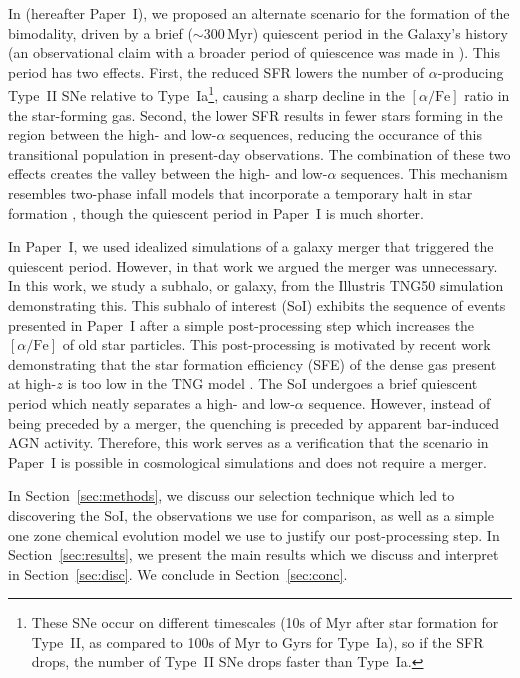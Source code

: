 \documentclass[twocolumn]{aastex631}
\newcommand{\Myr}{\ensuremath{\textrm{Myr}}}
\newcommand{\alphaFe}{\ensuremath{[\alpha/\textrm{Fe}]}}
\begin{document}
In \citet{2024arXiv240707985B} (hereafter Paper~I), we proposed an alternate scenario for the formation of the bimodality, driven by a brief ($\sim300\,\Myr$) quiescent period in the Galaxy's history (an observational claim with a broader period of quiescence was made in \citet{2016A&A...589A..66H}). This period has two effects. First, the reduced SFR lowers the number of $\alpha$-producing Type~II SNe relative to Type~Ia\footnote{These SNe occur on different timescales (10s of Myr after star formation for Type~II, as compared to 100s of Myr to Gyrs for Type~Ia), so if the SFR drops, the number of Type~II SNe drops faster than Type~Ia.}, causing a sharp decline in the \alphaFe{} ratio in the star-forming gas. Second, the lower SFR results in fewer stars forming in the region between the high- and low-$\alpha$ sequences, reducing the occurance of this transitional population in present-day observations. The combination of these two effects creates the valley between the high- and low-$\alpha$ sequences. This mechanism resembles two-phase infall models that incorporate a temporary halt in star formation \citep[][and references therein]{2024arXiv240511025S}, though the quiescent period in Paper~I is much shorter.

In Paper~I, we used idealized simulations of a galaxy merger that triggered the quiescent period. However, in that work we argued the merger was unnecessary. In this work, we study a subhalo, or galaxy, from the Illustris TNG50 simulation demonstrating this. This subhalo of interest (SoI) exhibits the sequence of events presented in Paper~I after a simple post-processing step which increases the \alphaFe{} of old star particles. This post-processing is motivated by recent work demonstrating that the star formation efficiency (SFE) of the dense gas present at high-$z$ is too low in the TNG model \citep{2024arXiv240909121H}. The SoI undergoes a brief quiescent period which neatly separates a high- and low-$\alpha$ sequence. However, instead of being preceded by a merger, the quenching is preceded by apparent bar-induced AGN activity. Therefore, this work serves as a verification that the scenario in Paper~I is possible in cosmological simulations and does not require a merger.

In Section~\ref{sec:methods}, we discuss our selection technique which led to discovering the SoI, the observations we use for comparison, as well as a simple one zone chemical evolution model we use to justify our post-processing step. In Section~\ref{sec:results}, we present the main results which we discuss and interpret in Section~\ref{sec:disc}. We conclude in Section~\ref{sec:conc}.
\end{document}
